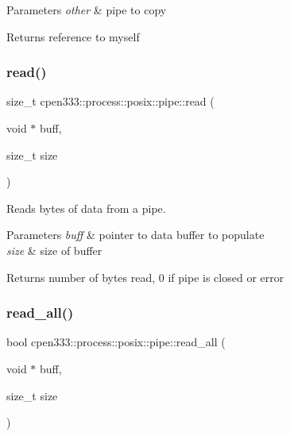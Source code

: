 \begin{DoxyParams}{Parameters}
{\em other} & pipe to copy \\
\hline
\end{DoxyParams}
\begin{DoxyReturn}{Returns}
reference to myself 
\end{DoxyReturn}
\mbox{\label{classcpen333_1_1process_1_1posix_1_1pipe_a20e936e70690065c30f0600aa8f1b0d3}} 
\subsubsection{\texorpdfstring{read()}{read()}}
{\footnotesize\ttfamily size\+\_\+t cpen333\+::process\+::posix\+::pipe\+::read (\begin{DoxyParamCaption}\item[{void $\ast$}]{buff,  }\item[{size\+\_\+t}]{size }\end{DoxyParamCaption})\hspace{0.3cm}{\ttfamily [inline]}}



Reads bytes of data from a pipe. 


\begin{DoxyParams}{Parameters}
{\em buff} & pointer to data buffer to populate \\
\hline
{\em size} & size of buffer \\
\hline
\end{DoxyParams}
\begin{DoxyReturn}{Returns}
number of bytes read, 0 if pipe is closed or error 
\end{DoxyReturn}
\mbox{\label{classcpen333_1_1process_1_1posix_1_1pipe_a8697e5c707442bce2eae0b9afbf44ac1}} 
\subsubsection{\texorpdfstring{read\+\_\+all()}{read\_all()}}
{\footnotesize\ttfamily bool cpen333\+::process\+::posix\+::pipe\+::read\+\_\+all (\begin{DoxyParamCaption}\item[{void $\ast$}]{buff,  }\item[{size\+\_\+t}]{size }\end{DoxyParamCaption})\hspace{0.3cm}{\ttfamily [inline]}}



